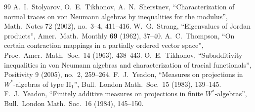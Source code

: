 \documentclass[11pt]{article}
\theoremstyle{plain}
\theoremstyle{definition}
\theoremstyle{remark}
\begin{document}
{\begin{thebibliography}{99}
 A.~I.~Stolyarov, O.~E.~Tikhonov, A.~N.~Sherstnev, ``Characterization of normal traces on
  von Neumann algebras by inequalities for the modulus'', Math.\ Notes 72 (2002), no.~3--4, 411--416.
 W.~G.~Strang, ``Eigenvalues of Jordan products'', Amer.\ Math.\ Monthly \textbf{69} (1962),
37--40.
 A.~C.~Thompson, ``On certain contraction mappings in a partially ordered vector space'',
  Proc.\ Amer.\ Math.\ Soc.\ 14 (1963), 438--443.
 O.~E.~Tikhonov, ``Subadditivity inequalities in von Neumann algebras and characterization of
  tracial functionals'', Positivity 9 (2005), no.~2, 259--264.
 F.~J.~Yeadon, ``Measures on projections in $W^*$-algebras of type II$_1$'', Bull.\ London Math.\ Soc.\ 15
  (1983), 139--145.
 F.~J.~Yeadon, ``Finitely additive measures on projections in finite $W^*$-algebras'', Bull.\ London
  Math.\ Soc.\ 16 (1984), 145--150.
\end{thebibliography}
}
\end{document}
